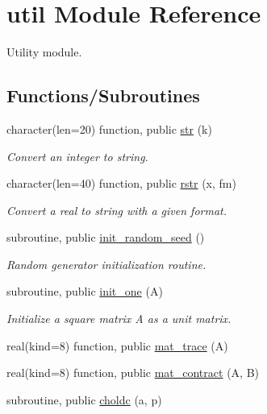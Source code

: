 \hypertarget{namespaceutil}{}\section{util Module Reference}
\label{namespaceutil}


Utility module.  


\subsection*{Functions/\+Subroutines}
\begin{DoxyCompactItemize}
\item 
character(len=20) function, public \hyperlink{namespaceutil_a1df36d0696c9183ceb6bb770f1d88111}{str} (k)
\begin{DoxyCompactList}\small\item\em Convert an integer to string. \end{DoxyCompactList}\item 
character(len=40) function, public \hyperlink{namespaceutil_ac1630658a46867b1f7255eaa51198bf3}{rstr} (x, fm)
\begin{DoxyCompactList}\small\item\em Convert a real to string with a given format. \end{DoxyCompactList}\item 
subroutine, public \hyperlink{namespaceutil_a3c2dcf05b068a55f0066d2b393e75dc7}{init\+\_\+random\+\_\+seed} ()
\begin{DoxyCompactList}\small\item\em Random generator initialization routine. \end{DoxyCompactList}\item 
subroutine, public \hyperlink{namespaceutil_aca7f2465fedb87fef954d8f0c30668c7}{init\+\_\+one} (A)
\begin{DoxyCompactList}\small\item\em Initialize a square matrix A as a unit matrix. \end{DoxyCompactList}\item 
real(kind=8) function, public \hyperlink{namespaceutil_a9771c95546d8658e72aa24f76612e4d8}{mat\+\_\+trace} (A)
\item 
real(kind=8) function, public \hyperlink{namespaceutil_a8a0e15c77e8cd4cb03b608e4d6bfba67}{mat\+\_\+contract} (A, B)
\item 
subroutine, public \hyperlink{namespaceutil_ab832eeb8a78ffacc12e3ceac27f95ee7}{choldc} (a, p)
\item 

\end{DoxyCompactItemize}
